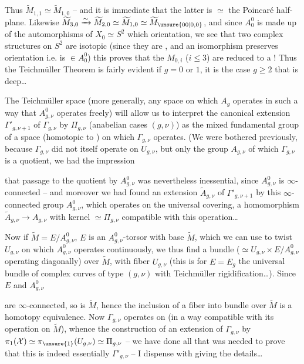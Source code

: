 Thus $\widetilde M_{1,1}\simeq\widetilde M_{1,0}$ -- and it is immediate that the latter is $\simeq$ the Poincaré half-plane. Likewise
$\widetilde M_{3,0}\xrightarrow{\sim}\widetilde M_{2,0}\simeq\widetilde M_{1,0}\simeq\widetilde M_{\unsure{00|0,0}}$,
and since $A_0^0$ is  made up of the automorphisms of $X_0\simeq S^2$ which  orientation, we see that two complex structures on $S^2$ are isotopic (since they are , and an isomorphism preserves orientation i.e. is $\in A_0^0$) this proves that the $M_{0,i}$ ($i\leq 3$) are reduced to a  ! Thus the Teichmüller Theorem is fairly evident if $g=0$ or $1$, it is the case $g\geq 2$ that is deep\ldots

The Teichmüller space (more generally, any  space  on which $A_g$ operates in such a way that $A_{g,\nu}^0$ operates freely) will allow us to interpret the canonical extension $\Gamma'_{g,\nu+1}$ of $\Gamma_{g,\nu}$ by $\Pi_{g,\nu}$ (anabelian cases $(g,\nu)$) as the mixed fundamental group of a  space (homotopic to ) on which $\Gamma_{g,\nu}$ operates. (We were bothered previously, because $\Gamma_{g,\nu}$ did not itself operate on $U_{g,\nu}$, but only the group $A_{g,\nu}$ of which $\Gamma_{g,\nu}$ is a quotient, we had the impression

that passage to the quotient by $A_{g,\nu}^0$ was nevertheless inessential, since $A_{g,\nu}^0$ is $\infty$-connected -- and moreover we had found an extension $\widetilde A_{g,\nu}$ of $\Gamma'_{g,\nu+1}$ by this  $\infty$-connected group $A_{g,\nu}^0$, which operates on the universal covering,    a homomorphism  $\widetilde A_{g,\nu}\to A_{g,\nu}$ with kernel $\simeq\Pi_{g,\nu}$ compatible with this operation\ldots

Now if $\widetilde M=E/A_{g,\nu}^0$, $E$ is an $A_{g,\nu}^0$-torsor with base $\widetilde M$, which we can use to twist  $U_{g,\nu}$ on which $A_{g,\nu}^0$ operates continuously, we thus find a bundle  ($\simeq U_{g,\nu}\times E/A_{g,\nu}^0$ operating diagonally) over $\widetilde M$, with fiber $U_{g,\nu}$ (this is for $E=E_g$ the universal bundle of complex curves of type $(g,\nu)$ with Teichmüller rigidification\ldots). Since $E$ and $A_{g,\nu}^0$

are $\infty$-connected, so is $\widetilde M$, hence the inclusion of a fiber into  bundle  over $\widetilde M$ is a homotopy equivalence. Now $\Gamma_{g,\nu}$ operates on  (in a way compatible with its operation on $\widetilde M$), whence the construction of an extension of $\Gamma_{g,\nu}$ by $\pi_1(\mathcal X)\simeq\pi_{\unsure{1}}(U_{g,\nu})\simeq\Pi_{g,\nu}$ -- we have done all that was needed to prove that this is indeed essentially $\Gamma'_{g,\nu}$ -- I dispense with giving the details\ldots

